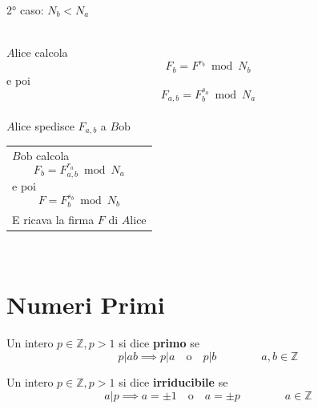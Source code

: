 \documentclass[a4paper,12pt, oneside]{book}
\begin{document}
			2° caso: $N_b < N_a$\\\\
			\begin{minipage}{0.45\textwidth}
				$A\mbox{lice}$ calcola 
				$$F_b = F^{r_b} \bmod N_b$$
				e poi
				$$F_{a,b} = F_{b}^{s_{a}} \bmod N_{a}$$\\
				$A\mbox{lice}$ spedisce $F_{a,b}$ a $B\mbox{ob}$
			\end{minipage}%
			\hfill
			\begin{minipage}{0.45\textwidth}
				\begin{tabular}{|p{\textwidth}}
					$B\mbox{ob}$ calcola 
					$$F_{b} = F_{a,b}^{r_{a}} \bmod N_{a}$$
					e poi
					$$F = F_b^{s_b} \bmod N_b$$\\
					E ricava la firma $F$ di $A\mbox{lice}$
				\end{tabular}
			\end{minipage}\\%
			
			\newpage
			
\chapter{Numeri Primi}
	
	\begin{definizione}
		Un intero $p \in \mathbb{Z}, p>1$ si dice \textbf{primo} se
		$$p|ab \implies p|a \quad \mbox{o} \quad p|b \qquad\qquad a,b \in \mathbb{Z}$$
	\end{definizione}
	
	\begin{definizione}
		Un intero $p \in \mathbb{Z}, p>1$ si dice \textbf{irriducibile} se
		$$a|p \implies a=\pm 1 \quad \mbox{o} \quad a=\pm p \qquad\qquad a \in \mathbb{Z}$$
	\end{definizione}
	
\end{document}
